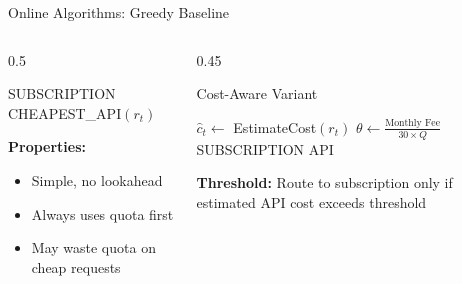 \documentclass[aspectratio=169,10pt]{beamer}
\begin{document}
\begin{frame}{Online Algorithms: Greedy Baseline}
\begin{columns}[T]
\begin{column}{0.5\textwidth}
\begin{algorithm}[H]
\caption{Greedy Strategy}
\begin{algorithmic}[1]
    \RETURN SUBSCRIPTION
\ELSE
    \RETURN CHEAPEST\_API$(r_t)$
\ENDIF
\end{algorithmic}
\end{algorithm}

\vspace{0.3cm}
\textbf{Properties:}
\begin{itemize}
    \item Simple, no lookahead
    \item Always uses quota first
    \item \alert{May waste quota on cheap requests}
\end{itemize}
\end{column}

\begin{column}{0.45\textwidth}
\begin{exampleblock}{Cost-Aware Variant}
\begin{algorithmic}[1]
\STATE $\hat{c}_t \gets$ EstimateCost$(r_t)$
\STATE $\theta \gets \frac{\text{Monthly Fee}}{30 \times Q}$
    \RETURN SUBSCRIPTION
\ELSE
    \RETURN API
\ENDIF
\end{algorithmic}
\end{exampleblock}

\vspace{0.2cm}
\textcolor{icmlblue}{\textbf{Threshold:}} Route to subscription only if estimated API cost exceeds threshold
\end{column}
\end{columns}
\end{frame}
\end{document}

